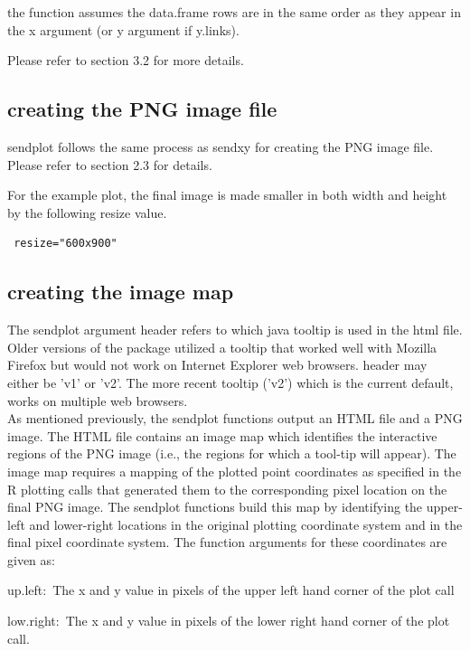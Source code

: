 \documentclass[]{article}
\begin{document}
 the function assumes the data.frame rows are in the same order as they appear in the x argument (or y argument if y.links).  \newline

\vspace{5mm}

 Please refer to section 3.2 for more details. 

\subsection{creating the PNG image file}

\indent sendplot follows the same process as sendxy for creating the PNG image file. Please refer to section 2.3 for details.

 For the example plot, the final image is made smaller in both width and height by the following resize value. \newline

\begin{verbatim}
 resize="600x900"

\end{verbatim}



\subsection{creating the image map}

\indent The sendplot argument header refers to which java tooltip is used in the html file. Older versions of the package utilized a tooltip that worked well with Mozilla Firefox but would not work on Internet Explorer web browsers. header may either be 'v1' or 'v2'. The more recent tooltip ('v2') which is the current default, works on multiple web browsers.\\


As mentioned previously, the sendplot functions output an HTML file and a PNG image. The HTML file contains an image map which identifies the interactive regions of the PNG image (i.e., the regions for which a tool-tip will appear). The image map requires a mapping of the plotted point coordinates as specified in the R plotting calls that generated them to the corresponding pixel location on the final PNG image. The sendplot functions build this map by identifying the upper-left and lower-right locations in the original plotting coordinate system and in the final pixel coordinate system. The function arguments for these coordinates are given as:
\begin{description}
  \item{up.left:~}{The x and y value in pixels of the upper left hand
    corner of the plot call}
  \item{low.right:~}{The x and y value in pixels of the lower right hand
    corner of the plot call.}
\end{description}
\end{document}
